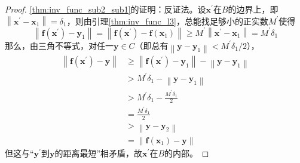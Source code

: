 \documentclass[main.tex]{subfiles}
\begin{document}
\begin{proof}
    \ref{thm:inv_func_sub2_sub1}的证明：反证法。设$\mathbf{x}^\prime$在$B$的边界上，即$\left\|\mathbf{x}^\prime-\mathbf{x}_1\right\|=\delta_1$，则由引理\ref{thm:inv_func_l3}，总能找足够小的正实数$M^\prime$使得
    \[\left\|\mathbf{f}\left(\mathbf{x}^\prime\right)-\mathbf{y}_1\right\|=\left\|\mathbf{f}\left(\mathbf{x}^\prime\right)-\mathbf{f}\left(\mathbf{x}_1\right)\right\|\geq M^\prime\left\|\mathbf{x}^\prime-\mathbf{x}_1\right\|=M^\prime\delta_1
    \]
    那么，由三角不等式，对任一$\mathbf{y}\in C$（即总有$\left\|\mathbf{y}-\mathbf{y}_1\right\|<M^\prime\delta_1/2$），
    \begin{align*}
        \left\|\mathbf{f}\left(\mathbf{x}^\prime\right)-\mathbf{y}\right\| & \geq\left\|\mathbf{f}\left(\mathbf{x}^\prime\right)-\mathbf{y}_1\right\|-\left\|\mathbf{y}-\mathbf{y}_1\right\| \\
                                                                           & >M^\prime\delta_1-\left\|\mathbf{y}-\mathbf{y}_1\right\|                                                        \\
                                                                           & >M^\prime\delta_1-\frac{M^\prime\delta_1}{2}                                                                    \\
                                                                           & =\frac{M^\prime\delta_1}{2}                                                                                     \\
                                                                           & >\left\|\mathbf{y}-\mathbf{y}_2\right\|                                                                         \\
                                                                           & =\left\|\mathbf{f}\left(\mathbf{x}_1\right)-\mathbf{y}\right\|
    \end{align*}
    但这与“$\mathbf{y}^\prime$到$\mathbf{y}$的距离最短”相矛盾，故$\mathbf{x}^\prime$在$B$的内部。


\end{proof}
\end{document}
